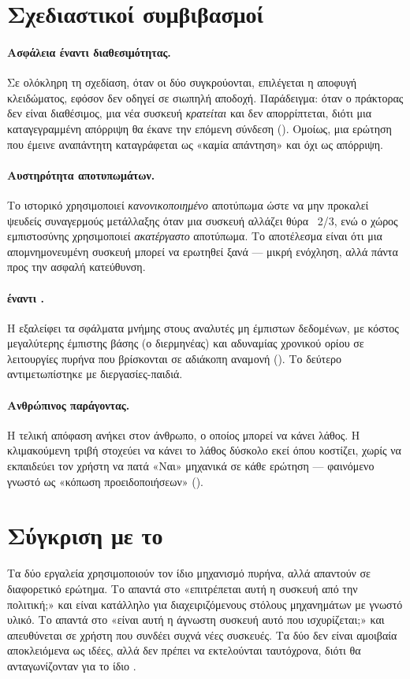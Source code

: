 \section{Σχεδιαστικοί συμβιβασμοί}
\label{sec:tradeoffs}

\paragraph{Ασφάλεια έναντι διαθεσιμότητας.}
Σε ολόκληρη τη σχεδίαση, όταν οι δύο συγκρούονται, επιλέγεται η αποφυγή
κλειδώματος, εφόσον δεν οδηγεί σε σιωπηλή αποδοχή. Παράδειγμα: όταν ο πράκτορας
δεν είναι διαθέσιμος, μια νέα συσκευή \emph{κρατείται} και δεν απορρίπτεται, διότι
μια καταγεγραμμένη απόρριψη θα έκανε την επόμενη σύνδεση \sevC{}
(). Ομοίως, μια ερώτηση που έμεινε αναπάντητη
καταγράφεται ως «καμία απάντηση» και όχι ως απόρριψη.

\paragraph{Αυστηρότητα αποτυπωμάτων.}
Το ιστορικό χρησιμοποιεί \emph{κανονικοποιημένο} αποτύπωμα ώστε να μην
προκαλεί ψευδείς συναγερμούς μετάλλαξης όταν μια συσκευή αλλάζει θύρα
~2/3, ενώ ο χώρος εμπιστοσύνης χρησιμοποιεί \emph{ακατέργαστο}
αποτύπωμα. Το αποτέλεσμα είναι ότι μια απομνημονευμένη συσκευή μπορεί να
ερωτηθεί ξανά — μικρή ενόχληση, αλλά πάντα προς την ασφαλή κατεύθυνση.

\paragraph{ έναντι .}
Η  εξαλείφει τα σφάλματα μνήμης στους αναλυτές μη έμπιστων
δεδομένων, με κόστος μεγαλύτερης έμπιστης βάσης (ο διερμηνέας) και αδυναμίας
χρονικού ορίου σε λειτουργίες πυρήνα που βρίσκονται σε αδιάκοπη αναμονή
(). Το δεύτερο αντιμετωπίστηκε με διεργασίες-παιδιά.

\paragraph{Ανθρώπινος παράγοντας.}
Η τελική απόφαση ανήκει στον άνθρωπο, ο οποίος μπορεί να κάνει λάθος. Η
κλιμακούμενη τριβή στοχεύει να κάνει το λάθος δύσκολο εκεί όπου κοστίζει, χωρίς
να εκπαιδεύει τον χρήστη να πατά «Ναι» μηχανικά σε κάθε ερώτηση — φαινόμενο
γνωστό ως «κόπωση προειδοποιήσεων» ().

\section{Σύγκριση με το }
\label{sec:vs-usbguard}

Τα δύο εργαλεία χρησιμοποιούν τον ίδιο μηχανισμό πυρήνα, αλλά απαντούν σε
διαφορετικό ερώτημα. Το  απαντά στο «επιτρέπεται αυτή η συσκευή
από την πολιτική;» και είναι κατάλληλο για διαχειριζόμενους στόλους
μηχανημάτων με γνωστό υλικό. Το \Probolos{} απαντά στο «είναι αυτή η άγνωστη
συσκευή αυτό που ισχυρίζεται;» και απευθύνεται σε χρήστη που συνδέει συχνά νέες
συσκευές. Τα δύο δεν είναι αμοιβαία αποκλειόμενα ως ιδέες, αλλά δεν πρέπει να
εκτελούνται ταυτόχρονα, διότι θα ανταγωνίζονταν για το ίδιο
.
